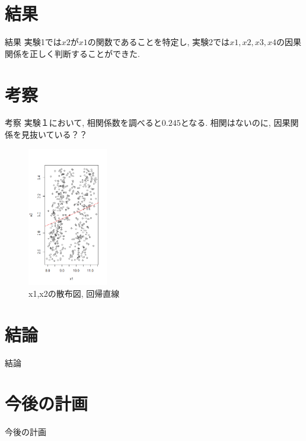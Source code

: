 \documentclass[dvipdfmx]{beamer}
\begin{document}
\section{結果}
\begin{frame}{結果}
実験1では$x2$が$x1$の関数であることを特定し, 実験2では$x1,x2,x3,x4$の因果関係を正しく判断することができた.
\end{frame}

\section{考察}
\begin{frame}{考察}
実験１において, 相関係数を調べると$0.245$となる.
相関はないのに, 因果関係を見抜いている？？

\begin{figure}[H]
\begin{center}
\includegraphics[clip,width=35mm]{data/sam1.png}
\caption{x1,x2の散布図, 回帰直線}
\end{center}
\end{figure}

\end{frame}


\section{結論}
\begin{frame}{結論}

\end{frame}

\section{今後の計画}
\begin{frame}{今後の計画}

\end{frame}
\end{document}
